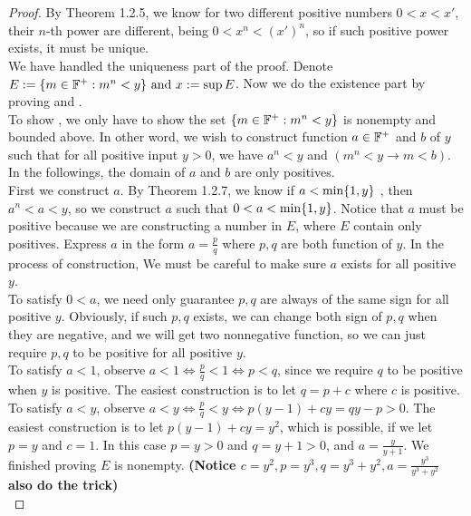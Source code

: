 \documentclass{report}
\begin{document}
\begin{proof}
By Theorem 1.2.5, we know for two different positive numbers $0<x<x'$, their $n$-th power are different, being $0<x^n<(x')^{n}$, so if such positive power exists, it must be unique.\\

We have handled the uniqueness part of the proof. Denote $E:= \{ m \in\mathbb{F}^+: m^n<y \}\text{ and }x:=\sup E$. Now we do the existence part by proving  and  .\\

To show , we only have to show the set $\{ m \in\mathbb{F}^+: m^n<y \}$ is nonempty and bounded above. In other word, we wish to construct function $a\in\mathbb{F}^+$ and $b$ of $y$ such that for all positive input $y>0$, we have $a^n<y$ and $(m^n<y\longrightarrow m<b)$. In the followings, the domain of $a$ and $b$ are only positives.\\

First we construct $a$. By Theorem 1.2.7, we know if $a<\min \{ 1,y \}$ , then $a^n<a<y$, so we construct $a$ such that $0<a<\min \{ 1,y \}$. Notice that $a$ must be positive because we are constructing a number in $E$, where $E$ contain only positives. Express $a$ in the form  $a=\frac{p}{q}$ where $p,q$ are both function of $y$. In the process of  construction, We must be careful to make sure $a$ exists for all positive $y$.\\

To satisfy $0<a$, we need only guarantee $p,q$ are always of the same sign for all positive $y$. Obviously, if such $p,q$ exists, we can change both sign of  $p,q$ when they are negative, and we will get two nonnegative function, so we can just require $p,q$ to be positive for all positive $y$.\\      

To satisfy $a<1$, observe $a<1\iff \frac{p}{q}<1\iff p<q$, since we require $q$ to be positive when $y$ is positive. The easiest construction is to let $q=p+c$ where $c$ is positive.\\

To satisfy $a<y$, observe $a<y\iff \frac{p}{q}<y\iff p(y-1)+cy=qy-p>0$. The easiest construction is to let $p(y-1)+cy=y^2$, which is possible, if we let $p=y$ and $c=1$. In this case $p=y>0$ and $q=y+1>0$, and  $a=\frac{y}{y+1}$. We finished proving $E$ is nonempty. \textbf{(Notice $c=y^2,p=y^3,q=y^3+y^2,a=\frac{y^3}{y^3+y^2}$ also do the trick)}\\


\end{proof}
\end{document}
